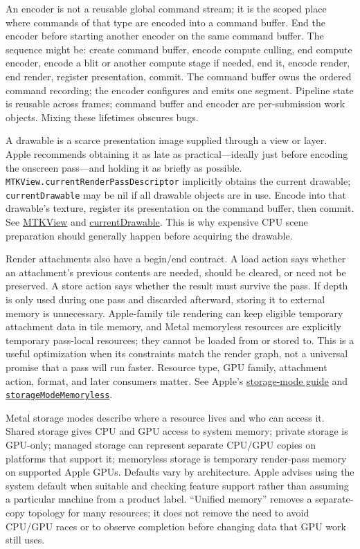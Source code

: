 An encoder is not a reusable global command stream; it is the scoped place where commands of that type are encoded into a command buffer. End the encoder before starting another encoder on the same command buffer. The sequence might be: create command buffer, encode compute culling, end compute encoder, encode a blit or another compute stage if needed, end it, encode render, end render, register presentation, commit. The command buffer owns the ordered command recording; the encoder configures and emits one segment. Pipeline state is reusable across frames; command buffer and encoder are per-submission work objects. Mixing these lifetimes obscures bugs.

A drawable is a scarce presentation image supplied through a view or layer. Apple recommends obtaining it as late as practical---ideally just before encoding the onscreen pass---and holding it as briefly as possible. \texttt{MTKView.currentRenderPassDescriptor} implicitly obtains the current drawable; \texttt{currentDrawable} may be nil if all drawable objects are in use. Encode into that drawable's texture, register its presentation on the command buffer, then commit. See \href{https://developer.apple.com/documentation/metalkit/mtkview/}{MTKView} and \href{https://developer.apple.com/documentation/MetalKit/MTKView/currentDrawable}{currentDrawable}. This is why expensive CPU scene preparation should generally happen before acquiring the drawable.

Render attachments also have a begin/end contract. A load action says whether an attachment's previous contents are needed, should be cleared, or need not be preserved. A store action says whether the result must survive the pass. If depth is only used during one pass and discarded afterward, storing it to external memory is unnecessary. Apple-family tile rendering can keep eligible temporary attachment data in tile memory, and Metal memoryless resources are explicitly temporary pass-local resources; they cannot be loaded from or stored to. This is a useful optimization when its constraints match the render graph, not a universal promise that a pass will run faster. Resource type, GPU family, attachment action, format, and later consumers matter. See Apple's \href{https://developer.apple.com/documentation/metal/setting-resource-storage-modes}{storage-mode guide} and \href{https://developer.apple.com/documentation/metal/mtlresourceoptions/storagemodememoryless}{\texttt{storageModeMemoryless}}.

Metal storage modes describe where a resource lives and who can access it. Shared storage gives CPU and GPU access to system memory; private storage is GPU-only; managed storage can represent separate CPU/GPU copies on platforms that support it; memoryless storage is temporary render-pass memory on supported Apple GPUs. Defaults vary by architecture. Apple advises using the system default when suitable and checking feature support rather than assuming a particular machine from a product label. ``Unified memory'' removes a separate-copy topology for many resources; it does not remove the need to avoid CPU/GPU races or to observe completion before changing data that GPU work still uses.

